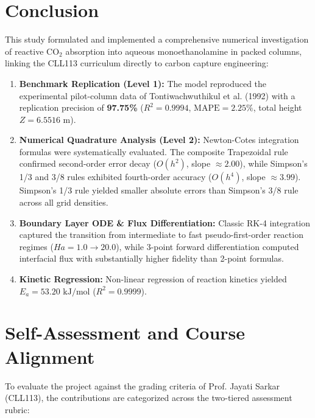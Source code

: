 \documentclass[11pt,a4paper]{article}
\begin{document}
\section{Conclusion}
This study formulated and implemented a comprehensive numerical investigation of reactive $\text{CO}_2$ absorption into aqueous monoethanolamine in packed columns, linking the CLL113 curriculum directly to carbon capture engineering:
\begin{enumerate}
    \item \textbf{Benchmark Replication (Level 1):} The model reproduced the experimental pilot-column data of Tontiwachwuthikul et al. (1992) with a replication precision of \textbf{97.75\%} ($R^2 = 0.9994$, $\text{MAPE} = 2.25\%$, total height $Z = 6.5516\text{ m}$).
    \item \textbf{Numerical Quadrature Analysis (Level 2):} Newton-Cotes integration formulas were systematically evaluated. The composite Trapezoidal rule confirmed second-order error decay ($O(h^2)$, slope $\approx 2.00$), while Simpson's 1/3 and 3/8 rules exhibited fourth-order accuracy ($O(h^4)$, slope $\approx 3.99$). Simpson's 1/3 rule yielded smaller absolute errors than Simpson's 3/8 rule across all grid densities.
    \item \textbf{Boundary Layer ODE & Flux Differentiation:} Classic RK-4 integration captured the transition from intermediate to fast pseudo-first-order reaction regimes ($Ha = 1.0 \to 20.0$), while 3-point forward differentiation computed interfacial flux with substantially higher fidelity than 2-point formulas.
    \item \textbf{Kinetic Regression:} Non-linear regression of reaction kinetics yielded $E_a = 53.20\text{ kJ/mol}$ ($R^2 = 0.9999$).
\end{enumerate}

\section{Self-Assessment and Course Alignment}
To evaluate the project against the grading criteria of Prof. Jayati Sarkar (CLL113), the contributions are categorized across the two-tiered assessment rubric:
\end{document}
